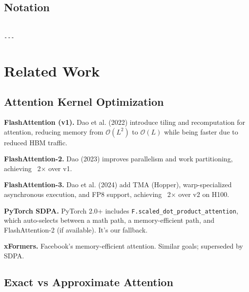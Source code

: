 \subsection{Notation}

\begin{lstlisting}

---
\end{lstlisting}

\section{Related Work}

\subsection{Attention Kernel Optimization}

\textbf{FlashAttention (v1).} Dao et al. (2022) introduce tiling and 
recomputation for attention, reducing memory from $\mathcal{O}(L^2)$ to 
$\mathcal{O}(L)$ while being faster due to reduced HBM traffic.

\textbf{FlashAttention-2.} Dao (2023) improves parallelism and work partitioning, 
achieving ~2$\times$ over v1.

\textbf{FlashAttention-3.} Dao et al. (2024) add TMA (Hopper), warp-specialized 
asynchronous execution, and FP8 support, achieving ~2$\times$ over v2 on H100.

\textbf{PyTorch SDPA.} PyTorch 2.0+ includes \texttt{F.scaled\_dot\_product\_attention}, 
which auto-selects between a math path, a memory-efficient path, and 
FlashAttention-2 (if available). It's our fallback.

\textbf{xFormers.} Facebook's memory-efficient attention. Similar goals; 
superseded by SDPA.

\subsection{Exact vs Approximate Attention}

